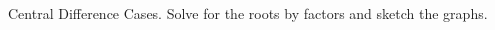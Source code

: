 \documentclass[12pt, a4paper, addpoints]{exam}
\begin{document}
\begin{questions}
\question Central Difference Cases. Solve for the roots by factors  and sketch the graphs. 
\setlength{\columnsep}{20pt}
\begin{multicols}{3}
\end{multicols}


\end{questions}
\end{document}
